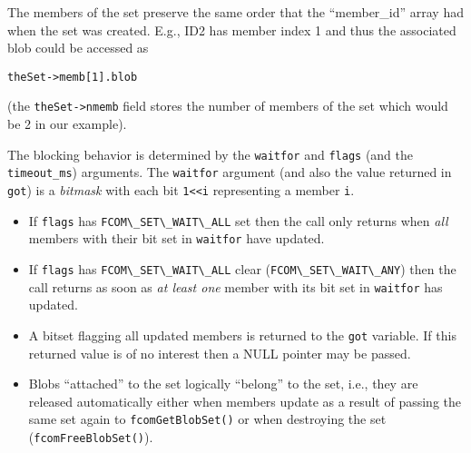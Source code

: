 \documentclass[11pt]{article}
\newcommand{\Blob}{Blob}
\newcommand{\set}{set}
\newcommand{\cstl}[1]{{\lstinline+#1+}}
\begin{document}
      The members of the \set{} preserve the same order that the ``member\_id'' array
      had when the \set{} was created. E.g., ID2 has member index 1 and thus the
      associated blob could be accessed as
      \begin{verbatim}
theSet->memb[1].blob
      \end{verbatim}
      (the \cstl{theSet->nmemb} field stores the number of members of the set which would
      be 2 in our example).

      The blocking behavior is determined by the \cstl{waitfor} and \cstl{flags} 
      (and the \cstl{timeout_ms}) arguments. The \cstl{waitfor} argument (and also the value
      returned in \cstl{got}) is a {\em bitmask} with each bit \cstl{1<<i} 
      representing a member \cstl{i}.
     
      \begin{itemize}
        \item If \cstl{flags} has \cstl{FCOM\_SET\_WAIT\_ALL} set then the call
              only returns when {\em all} members with their bit set in \cstl{waitfor}
              have updated.
        \item If \cstl{flags} has \cstl{FCOM\_SET\_WAIT\_ALL} clear
              (\cstl{FCOM\_SET\_WAIT\_ANY}) then the call returns as soon as {\em at least
              one} member with its bit set in \cstl{waitfor} has updated.
        \item A bitset flagging all updated members is returned to the \cstl{got}
              variable. If this returned value is of no interest then a NULL pointer 
              may be passed.
        \item \Blob{}s ``attached'' to the \set{} logically ``belong'' to the \set,
              i.e., they are released automatically either when members update
              as a result of passing the same \set{} again to \cstl{fcomGetBlobSet()}
              or when destroying the \set{} (\cstl{fcomFreeBlobSet()}).


\end{itemize}
\end{document}
